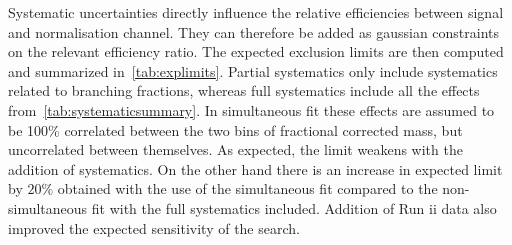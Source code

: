Systematic uncertainties directly influence the relative efficiencies between signal and normalisation channel. They can therefore be added as gaussian constraints on the relevant efficiency ratio. The expected exclusion limits are then computed and summarized in~\autoref{tab:explimits}. Partial systematics only include systematics related to branching fractions, whereas full systematics include all the effects from~\autoref{tab:systematicsummary}. In simultaneous fit these effects are assumed to be 100\% correlated between the two bins of fractional corrected mass, but uncorrelated between themselves. As expected, the limit weakens with the addition of systematics. On the other hand there is an increase in expected limit by $20\%$ obtained with the use of the simultaneous fit compared to the non-simultaneous fit with the full systematics included. Addition of Run \Rn{2} data also improved the expected sensitivity of the search. 

